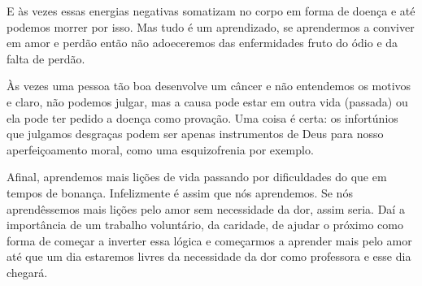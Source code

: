 \emdash{}E às vezes essas energias negativas somatizam no corpo em forma de doença e até podemos morrer por isso. Mas tudo é um aprendizado, se aprendermos a conviver em amor e perdão então não adoeceremos das enfermidades fruto do ódio e da falta de perdão.

\emdash{}Às vezes uma pessoa tão boa desenvolve um câncer e não entendemos os motivos e claro, não podemos julgar, mas a causa pode estar em outra vida (passada) ou ela pode ter pedido a doença como provação. Uma coisa é certa: os infortúnios que julgamos desgraças podem ser apenas instrumentos de Deus para nosso aperfeiçoamento moral, como uma esquizofrenia por exemplo. 

\emdash{}Afinal, aprendemos mais lições de vida passando por dificuldades do que em tempos de bonança. Infelizmente é assim que nós aprendemos. Se nós aprendêssemos mais lições pelo amor sem necessidade da dor, assim seria. Daí a importância de um trabalho voluntário, da caridade, de ajudar o próximo como forma de começar a inverter essa lógica e começarmos a aprender mais pelo amor até que um dia estaremos livres da necessidade da dor como professora e esse dia chegará.